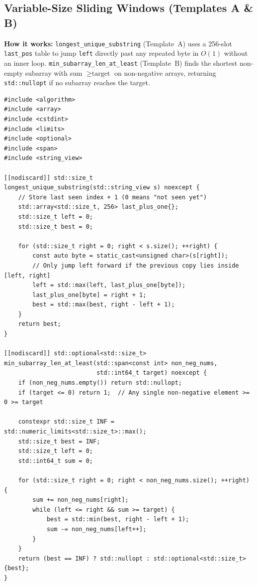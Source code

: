 \documentclass[11pt,a4paper]{article}
\theoremstyle{definition}
\begin{document}
\subsection{Variable-Size Sliding Windows (Templates A \& B)}

\textbf{How it works:} \texttt{longest\_unique\_substring} (Template~A) uses a 256-slot \texttt{last\_pos} table to jump \texttt{left} directly past any repeated byte in $O(1)$ without an inner loop. \texttt{min\_subarray\_len\_at\_least} (Template~B) finds the shortest non-empty subarray with sum $\ge \text{target}$ on non-negative arrays, returning \texttt{std::nullopt} if no subarray reaches the target.

\begin{lstlisting}[caption={Variable-size sliding window: longest unique substring and shortest sum $\ge S$.}]
#include <algorithm>
#include <array>
#include <cstdint>
#include <limits>
#include <optional>
#include <span>
#include <string_view>

[[nodiscard]] std::size_t
longest_unique_substring(std::string_view s) noexcept {
    // Store last seen index + 1 (0 means "not seen yet")
    std::array<std::size_t, 256> last_plus_one{};
    std::size_t left = 0;
    std::size_t best = 0;

    for (std::size_t right = 0; right < s.size(); ++right) {
        const auto byte = static_cast<unsigned char>(s[right]);
        // Only jump left forward if the previous copy lies inside [left, right]
        left = std::max(left, last_plus_one[byte]);
        last_plus_one[byte] = right + 1;
        best = std::max(best, right - left + 1);
    }
    return best;
}

[[nodiscard]] std::optional<std::size_t>
min_subarray_len_at_least(std::span<const int> non_neg_nums,
                          std::int64_t target) noexcept {
    if (non_neg_nums.empty()) return std::nullopt;
    if (target <= 0) return 1;  // Any single non-negative element >= 0 >= target

    constexpr std::size_t INF = std::numeric_limits<std::size_t>::max();
    std::size_t best = INF;
    std::size_t left = 0;
    std::int64_t sum = 0;

    for (std::size_t right = 0; right < non_neg_nums.size(); ++right) {
        sum += non_neg_nums[right];
        while (left <= right && sum >= target) {
            best = std::min(best, right - left + 1);
            sum -= non_neg_nums[left++];
        }
    }
    return (best == INF) ? std::nullopt : std::optional<std::size_t>{best};
}
\end{lstlisting}
\end{document}
